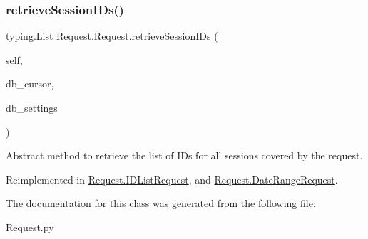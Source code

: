 \subsubsection{\texorpdfstring{retrieveSessionIDs()}{retrieveSessionIDs()}}
{\footnotesize\ttfamily  typing.\+List Request.\+Request.\+retrieve\+Session\+I\+Ds (\begin{DoxyParamCaption}\item[{}]{self,  }\item[{}]{db\+\_\+cursor,  }\item[{}]{db\+\_\+settings }\end{DoxyParamCaption})}



Abstract method to retrieve the list of I\+Ds for all sessions covered by the request. 



Reimplemented in \mbox{\hyperlink{class_request_1_1_i_d_list_request_a444c98ee565920afcd145fb9081f0eb1}{Request.\+I\+D\+List\+Request}}, and \mbox{\hyperlink{class_request_1_1_date_range_request_a6225fcabddc26682a0964b9438d3e845}{Request.\+Date\+Range\+Request}}.



The documentation for this class was generated from the following file\+:\begin{DoxyCompactItemize}
\item 
Request.\+py\end{DoxyCompactItemize}
